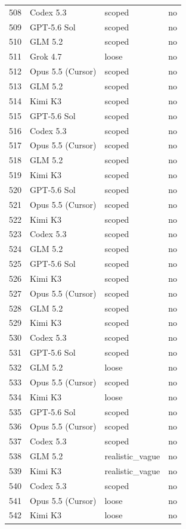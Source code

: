 \begin{tabular}{llll}
508 & Codex 5.3 & scoped & no \\
509 & GPT-5.6 Sol & scoped & no \\
510 & GLM 5.2 & scoped & no \\
511 & Grok 4.7 & loose & no \\
512 & Opus 5.5 (Cursor) & scoped & no \\
513 & GLM 5.2 & scoped & no \\
514 & Kimi K3 & scoped & no \\
515 & GPT-5.6 Sol & scoped & no \\
516 & Codex 5.3 & scoped & no \\
517 & Opus 5.5 (Cursor) & scoped & no \\
518 & GLM 5.2 & scoped & no \\
519 & Kimi K3 & scoped & no \\
520 & GPT-5.6 Sol & scoped & no \\
521 & Opus 5.5 (Cursor) & scoped & no \\
522 & Kimi K3 & scoped & no \\
523 & Codex 5.3 & scoped & no \\
524 & GLM 5.2 & scoped & no \\
525 & GPT-5.6 Sol & scoped & no \\
526 & Kimi K3 & scoped & no \\
527 & Opus 5.5 (Cursor) & scoped & no \\
528 & GLM 5.2 & scoped & no \\
529 & Kimi K3 & scoped & no \\
530 & Codex 5.3 & scoped & no \\
531 & GPT-5.6 Sol & scoped & no \\
532 & GLM 5.2 & loose & no \\
533 & Opus 5.5 (Cursor) & scoped & no \\
534 & Kimi K3 & loose & no \\
535 & GPT-5.6 Sol & scoped & no \\
536 & Opus 5.5 (Cursor) & scoped & no \\
537 & Codex 5.3 & scoped & no \\
538 & GLM 5.2 & realistic\_vague & no \\
539 & Kimi K3 & realistic\_vague & no \\
540 & Codex 5.3 & scoped & no \\
541 & Opus 5.5 (Cursor) & loose & no \\
542 & Kimi K3 & loose & no \\

\end{tabular}
